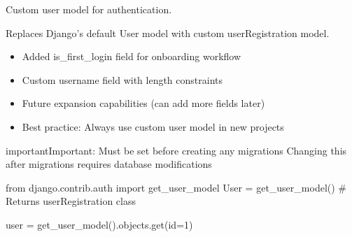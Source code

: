 \documentclass[letterpaper,10pt,english]{sphinxmanual}
\begin{document}

\begin{fulllineitems}
\label{\detokenize{softwareProject:softwareProject.settings.AUTH_USER_MODEL}}
\pysigstartsignatures
\pysigline
{}
\pysigstopsignatures
\sphinxAtStartPar
Custom user model for authentication.

\sphinxAtStartPar
Replaces Django’s default User model with custom userRegistration model.
\begin{description}
\begin{itemize}
\item {} 
\sphinxAtStartPar
Added is\_first\_login field for onboarding workflow

\item {} 
\sphinxAtStartPar
Custom username field with length constraints

\item {} 
\sphinxAtStartPar
Future expansion capabilities (can add more fields later)

\item {} 
\sphinxAtStartPar
Best practice: Always use custom user model in new projects

\end{itemize}

\end{description}

\begin{sphinxadmonition}{important}{Important:}
\sphinxAtStartPar
Must be set before creating any migrations
Changing this after migrations requires database modifications
\end{sphinxadmonition}
\begin{description}
\sphinxAtStartPar
from django.contrib.auth import get\_user\_model
User = get\_user\_model()  \# Returns userRegistration class

\sphinxAtStartPar
user = get\_user\_model().objects.get(id=1)

\end{description}

\end{fulllineitems}
\end{document}
